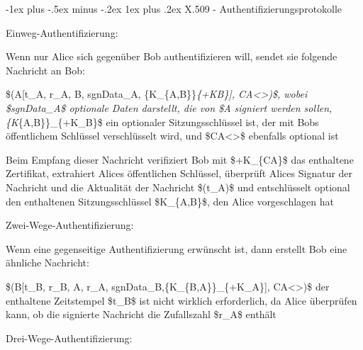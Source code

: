 \documentclass[a4paper]{article}
\makeatletter
\renewcommand{\subsubsection}{\@startsection{subsubsection}{3}{0mm}%
 {-1ex plus -.5ex minus -.2ex}%
 {1ex plus .2ex}%
 {\normalfont\small\bfseries}}
\makeatother
\begin{document}
\begin{multicols}{3}
      \subsubsection{X.509 -
            Authentifizierungsprotokolle}

      \begin{itemize*}
            \item
            Einweg-Authentifizierung:

            \begin{itemize*}
                  \item Wenn nur Alice sich gegenüber Bob authentifizieren will, sendet sie folgende Nachricht an Bob:
            \end{itemize*}

            \begin{enumerate*}
                  \def\labelenumi{\arabic{enumi}.}
                  \item \$(A{[}t\_A, r\_A, B, sgnData\_A, \{K\_\{A,B\}\}\emph{\{+KB\}{]}, CA\textless{}\textgreater)\$, wobei \$sgnData\_A\$ optionale Daten darstellt, die von \$A signiert werden sollen, \{K}\{A,B\}\}\_\{+K\_B\}\$ ein optionaler Sitzungsschlüssel ist, der mit Bobs öffentlichem Schlüssel verschlüsselt wird, und \$CA\textless{}\textgreater\$ ebenfalls optional ist
            \end{enumerate*}

            \begin{itemize*}
                  \item Beim Empfang dieser Nachricht verifiziert Bob mit \$+K\_\{CA\}\$ das enthaltene Zertifikat, extrahiert Alices öffentlichen Schlüssel, überprüft Alices Signatur der Nachricht und die Aktualität der Nachricht \$(t\_A)\$ und entschlüsselt optional den enthaltenen Sitzungsschlüssel \$K\_\{A,B\}\$, den Alice vorgeschlagen hat
            \end{itemize*}
            \item
            Zwei-Wege-Authentifizierung:

            \begin{itemize*}
                  \item Wenn eine gegenseitige Authentifizierung erwünscht ist, dann erstellt Bob eine ähnliche Nachricht:
            \end{itemize*}

            \begin{enumerate*}
                  \def\labelenumi{\arabic{enumi}.}
                  \setcounter{enumi}{1}
                  \item \$(B{[}t\_B, r\_B, A, r\_A, sgnData\_B,\{K\_\{B,A\}\}\_\{+K\_A\}{]}, CA\textless{}\textgreater)\$ der enthaltene Zeitstempel \$t\_B\$ ist nicht wirklich erforderlich, da Alice überprüfen kann, ob die signierte Nachricht die Zufallszahl \$r\_A\$ enthält
            \end{enumerate*}
            \item
            Drei-Wege-Authentifizierung:


\end{itemize*}
\end{multicols}
\end{document}
